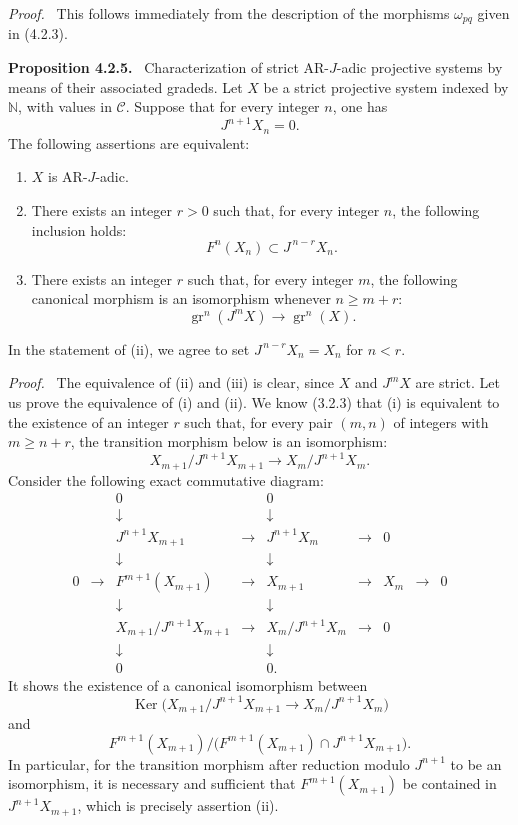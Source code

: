 \documentclass[11pt]{article}
\newenvironment{statement}[1]{\par\medskip\noindent\textbf{#1.}\ }{\par\medskip}
\newenvironment{prooftext}[1][Proof]{\par\noindent\emph{#1.}\ }{\par\medskip}
\providecommand{\Ker}{\operatorname{Ker}}
\providecommand{\gr}{\operatorname{gr}}
\providecommand{\Ker}{\operatorname{Ker}}
\providecommand{\gr}{\operatorname{gr}}
\providecommand{\gr}{\operatorname{gr}}
\providecommand{\Ker}{\operatorname{Ker}}
\begin{document}
\begin{prooftext}
This follows immediately from the description of the morphisms \(\omega_{pq}\) given in (4.2.3).
\end{prooftext}

\begin{statement}{Proposition 4.2.5}
Characterization of strict AR-\(J\)-adic projective systems by means of their associated gradeds. Let \(X\) be a strict projective system indexed by \(\mathbb N\), with values in \(\mathcal C\). Suppose that for every integer \(n\), one has
\[
J^{n+1}X_n=0.
\]
The following assertions are equivalent:
\begin{enumerate}[label=\textup{(\roman*)}]
\item \(X\) is AR-\(J\)-adic.
\item There exists an integer \(r>0\) such that, for every integer \(n\), the following inclusion holds:
\[
F^n(X_n)\subset J^{\,n-r}X_n.
\]
\item There exists an integer \(r\) such that, for every integer \(m\), the following canonical morphism is an isomorphism whenever \(n\ge m+r\):
\[
\gr^n(J^mX)\longrightarrow \gr^n(X).
\]
\end{enumerate}
In the statement of (ii), we agree to set \(J^{\,n-r}X_n=X_n\) for \(n<r\).
\end{statement}

\begin{prooftext}
The equivalence of (ii) and (iii) is clear, since \(X\) and \(J^mX\) are strict. Let us prove the equivalence of (i) and (ii). We know (3.2.3) that (i) is equivalent to the existence of an integer \(r\) such that, for every pair \((m,n)\) of integers with \(m\ge n+r\), the transition morphism below is an isomorphism:
\[
X_{m+1}/J^{n+1}X_{m+1}\longrightarrow X_m/J^{n+1}X_m.
\]
Consider the following exact commutative diagram:
\[
\begin{array}{ccccccccccc}
&&0&&0\\
&&\downarrow&&\downarrow\\
&&J^{n+1}X_{m+1}&\longrightarrow&J^{n+1}X_m&\longrightarrow&0\\
&&\downarrow&&\downarrow\\
0&\longrightarrow&F^{m+1}(X_{m+1})&\longrightarrow&X_{m+1}&\longrightarrow&X_m&\longrightarrow&0\\
&&\downarrow&&\downarrow\\
&&X_{m+1}/J^{n+1}X_{m+1}&\longrightarrow&X_m/J^{n+1}X_m&\longrightarrow&0\\
&&\downarrow&&\downarrow\\
&&0&&0 .
\end{array}
\]
It shows the existence of a canonical isomorphism between
\[
\Ker\bigl(X_{m+1}/J^{n+1}X_{m+1}
       \longrightarrow X_m/J^{n+1}X_m\bigr)
\]
and
\[
F^{m+1}(X_{m+1})/
\bigl(F^{m+1}(X_{m+1})\cap J^{n+1}X_{m+1}\bigr).
\]
In particular, for the transition morphism after reduction modulo \(J^{n+1}\) to be an isomorphism, it is necessary and sufficient that \(F^{m+1}(X_{m+1})\) be contained in \(J^{n+1}X_{m+1}\), which is precisely assertion (ii).
\end{prooftext}
\end{document}
